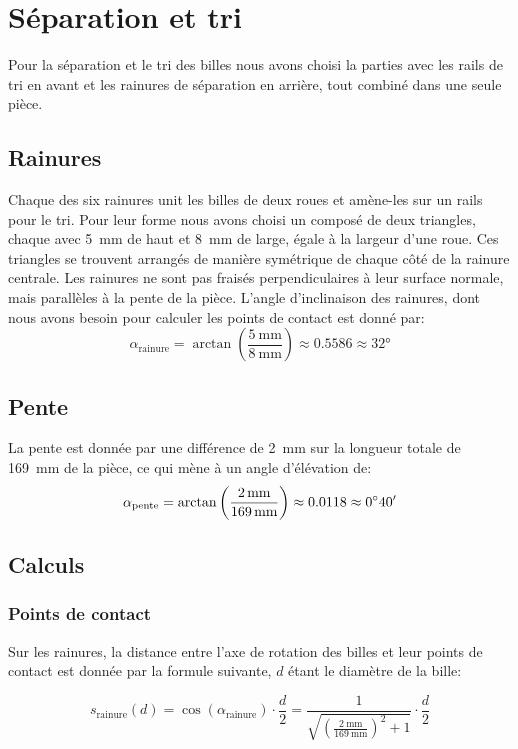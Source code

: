 \section{Séparation et tri}
Pour la séparation et le tri des billes nous avons choisi la parties avec les rails de tri en avant et les rainures de séparation en arrière, tout combiné dans une seule pièce.

\subsection{Rainures}
Chaque des six rainures unit les billes de deux roues et amène-les sur un rails pour le tri. Pour leur forme nous avons choisi un composé de deux triangles, chaque avec \SI{5}{\milli\metre} de haut et \SI{8}{\milli\metre} de large, égale à la largeur d'une roue. Ces triangles se trouvent arrangés de manière symétrique de chaque côté de la rainure centrale. Les rainures ne sont pas fraisés perpendiculaires à leur surface normale, mais parallèles à la pente de la pièce. L'angle d'inclinaison des rainures, dont nous avons besoin pour calculer les points de contact est donné par: \[\alpha_{\text{rainure}} = \arctan\left(\frac{\SI{5}{\milli\metre}}{\SI{8}{\milli\metre}}\right) \approx \num{0.5586} \approx \ang{32}\]

\subsection{Pente}
La pente est donnée par une différence de \SI{2}{\milli\metre} sur la longueur totale de \SI{169}{\milli\metre} de la pièce, ce qui mène à un angle d'élévation de:
\[\alpha_{\text{pente}} = \arctan\left(\frac{\SI{2}{\milli\metre}}{\SI{169}{\milli\metre}}\right) \approx \num{0.0118} \approx \sisetup{add-arc-degree-zero} \ang{;40;}\]

\subsection{Calculs}
\subsubsection{Points de contact}
Sur les rainures, la distance entre l'axe de rotation des billes et leur points de contact est donnée par la formule suivante, $d$ étant le diamètre de la bille:

\[s_{\text{rainure}}(d) = \cos(\alpha_{\text{rainure}}) \cdot \frac{d}{2} = \frac{1}{\sqrt{\left(\frac{\SI{2}{\milli\metre}}{\SI{169}{\milli\metre}}\right)^2+1}} \cdot \frac{d}{2}\]

